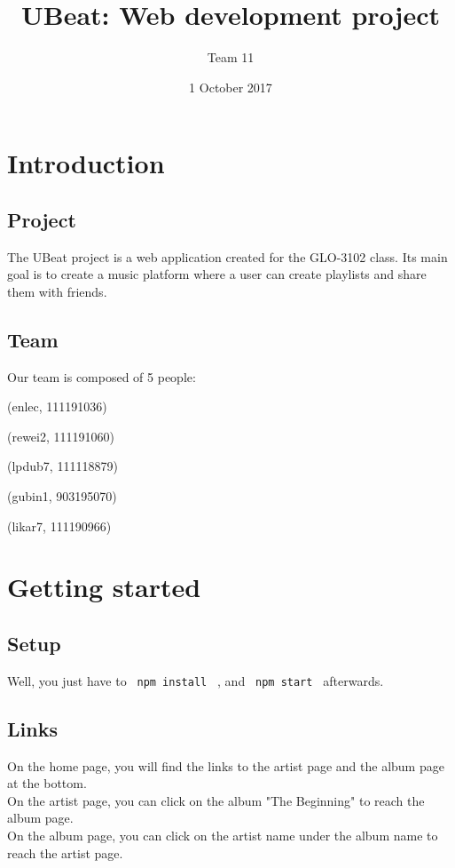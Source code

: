 \documentclass[11pt]{article}
\title{UBeat: Web development project}
\author{Team 11}
\date{1\up{st} October 2017}
\begin{document}
    \maketitle
    \newpage
    
    \section{Introduction}
    
        \subsection{Project}
        
        \noindent
        The UBeat project is a web application created for the GLO-3102 class. Its main goal is to create
        a music platform where a user can create playlists and share them with friends.
    
        \subsection{Team}
        
        \noindent
        Our team is composed of 5 people: \\
        
        \begin{description}[leftmargin=*]
        \item[Enora Le-Cavorzin] (enlec, 111191036)
        \item[Rémi Weislinger] (rewei2, 111191060)
        \item[Louis-Philippe Dubuc] (lpdub7, 111118879)
        \item[Guillaume Binet] (gubin1, 903195070)
        \item[Lionel Karmes] (likar7, 111190966)
        \end{description}
        
        

    \section{Getting started}
    
        \subsection{Setup}
    
        \noindent
        Well, you just have to \texttt{ npm install } , and \texttt{ npm start } afterwards.
        
        \subsection{Links}
        
		\noindent
		On the home page, you will find the links to the artist page and the album page at the bottom. \\
		On the artist page, you can click on the album "The Beginning" to reach the album page. \\
		On the album page, you can click on the artist name under the album name to reach the artist page.
\end{document}
